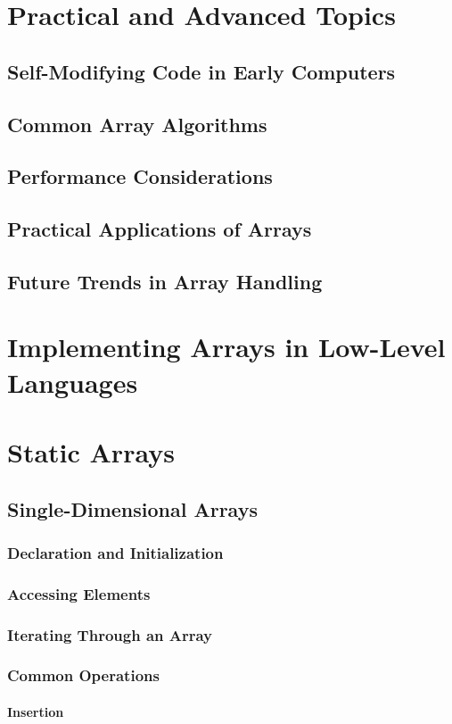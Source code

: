 \documentclass[12pt, oneside]{book}
\begin{document}
	\chapter{Practical and Advanced Topics}
	\section{Self-Modifying Code in Early Computers}
	\section{Common Array Algorithms}
	\section{Performance Considerations}
	\section{Practical Applications of Arrays}
	\section{Future Trends in Array Handling}
	\chapter{Implementing Arrays in Low-Level Languages}
	\chapter{Static Arrays}
	\section{Single-Dimensional Arrays}
	\subsection{Declaration and Initialization}
	\subsection{Accessing Elements}
	\subsection{Iterating Through an Array}
	\subsection{Common Operations}
	\subsubsection{Insertion}
\end{document}
